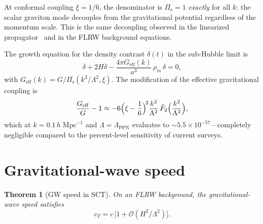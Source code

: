 \documentclass[12pt,a4paper]{article}
\newcommand{\Pis}{\Pi_{\mathrm{s}}}
\newcommand{\order}{\mathcal{O}}
\newcommand{\Lam}{\Lambda}
\theoremstyle{plain}
\newtheorem{theorem}{Theorem}[section]
\theoremstyle{definition}
\begin{document}
At conformal coupling $\xi = 1/6$, the denominator is $\Pis = 1$
\emph{exactly} for all $k$: the scalar graviton mode decouples from the
gravitational potential regardless of the momentum scale.  This is the
same decoupling observed in the linearized
propagator~\cite{Alfyorov:2026ff} and in the FLRW background
equations.

The growth equation for the density contrast $\delta(t)$ in the
sub-Hubble limit is
\begin{equation}\label{eq:growth-eq}
  \ddot{\delta} + 2H\dot{\delta}
  - \frac{4\pi G_{\mathrm{eff}}(k)}{a^3}\,\rho_m\,\delta = 0,
\end{equation}
with $G_{\mathrm{eff}}(k) = G/\Pis(k^2/\Lam^2,\xi)$.  The modification
of the effective gravitational coupling is
\begin{equation}\label{eq:Geff-deviation}
  \frac{G_{\mathrm{eff}}}{G} - 1
  \approx -6\Bigl(\xi - \frac{1}{6}\Bigr)^{\!2}
  \frac{k^2}{\Lam^2}\,\hat{F}_2\Bigl(\frac{k^2}{\Lam^2}\Bigr),
\end{equation}
which at $k = 0.1\,h\;\mathrm{Mpc}^{-1}$ and $\Lam = \Lam_{\mathrm{PPN}}$
evaluates to $\sim 5.5 \times 10^{-57}$---completely negligible compared
to the percent-level sensitivity of current surveys.

\section{Gravitational-wave speed}
\label{sec:gw-speed}

\begin{theorem}[GW speed in SCT]
\label{thm:gw-speed}
On an FLRW background, the gravitational-wave speed satisfies
\begin{equation}\label{eq:cT}
  c_T = c\,\bigl[1 + \order(H^2/\Lam^2)\bigr].
\end{equation}
\end{theorem}
\end{document}
